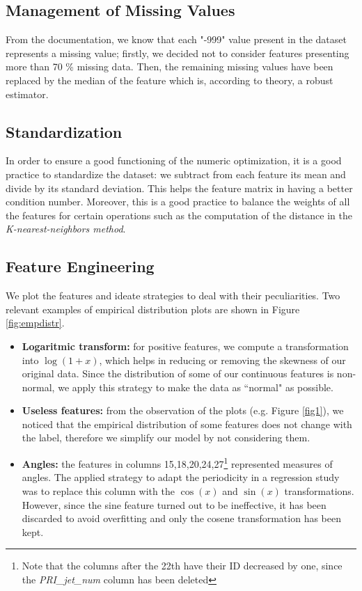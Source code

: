 \documentclass[10pt,conference,compsocconf]{IEEEtran}
\begin{document}
\subsection{Management of Missing Values}
From the documentation, we know that each "-999" value present in the dataset represents a missing value; firstly, we decided not to consider features presenting more than 70 \% missing data. Then, the remaining missing values have been replaced by the median of the feature which is, according to theory, a robust estimator.

\subsection{Standardization}
In order to ensure a good functioning of the numeric optimization, it is a good practice to standardize the dataset: we subtract from each feature its mean and divide by its standard deviation.
This helps the feature matrix in having a better condition number. Moreover, this is a good practice to balance the weights of all the features for certain operations such as the computation of the distance in the \emph{K-nearest-neighbors method}.

\subsection{Feature Engineering}
We plot the features and ideate strategies to deal with their peculiarities.
Two relevant examples of empirical distribution plots are shown in Figure \ref{fig:empdistr}.

\begin{itemize}
    \item \textbf{Logaritmic transform:} for positive features, we compute a transformation into $\log(1+x)$, which helps in reducing or removing the skewness of our original data. Since the distribution of some of our continuous features is non-normal, we apply this strategy to make the data as ``normal" as possible. 
    \item \textbf{Useless features:} from the observation of the plots (e.g. Figure \ref{fig1}), we noticed that the empirical distribution of some features does not change with the label, therefore we simplify our model by not considering them.
    \item \textbf{Angles:} the features in columns 15,18,20,24,27\footnote{Note that the columns after the 22th have their ID decreased by one, since the \emph{PRI\_jet\_num} column has been deleted} represented measures of angles. The applied strategy to adapt the periodicity in a regression study was to replace this column with the $\cos(x)$ and $\sin(x)$ transformations. However, since the sine feature turned out to be ineffective, it has been discarded to avoid overfitting and only the cosene transformation has been kept.
\end{itemize}
\end{document}
